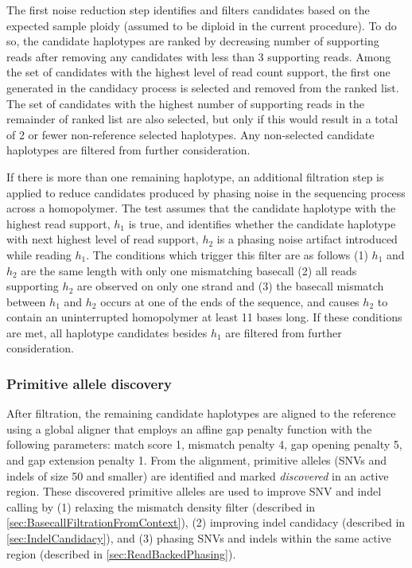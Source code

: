 \documentclass{article}
\begin{document}
The first noise reduction step identifies and filters candidates based on the expected sample ploidy (assumed to be diploid in the current procedure). To do so, the candidate haplotypes are ranked by decreasing number of supporting reads after removing any candidates with less than 3 supporting reads. Among the set of candidates with the highest level of read count support, the first one generated in the candidacy process is selected and removed from the ranked list. The set of candidates with the highest number of supporting reads in the remainder of ranked list are also selected, but only if this would result in a total of 2 or fewer non-reference selected haplotypes. Any non-selected candidate haplotypes are filtered from further consideration.

If there is more than one remaining haplotype, an additional filtration step is applied to reduce candidates produced by phasing noise in the sequencing process across a homopolymer. The test assumes that the candidate haplotype with the highest read support, $h_1$ is true, and identifies whether the candidate haplotype with next highest level of read support, $h_2$ is a phasing noise artifact introduced while reading $h_1$. The conditions which trigger this filter are as follows (1) $h_1$ and $h_2$ are the same length with only one mismatching basecall (2) all reads supporting $h_2$ are observed on only one strand and (3) the basecall mismatch between $h_1$ and $h_2$ occurs at one of the ends of the sequence, and causes $h_2$ to contain an uninterrupted homopolymer at least 11 bases long. If these conditions are met, all haplotype candidates besides $h_1$ are filtered from further consideration.

\subsubsection{Primitive allele discovery}
After filtration, the remaining candidate haplotypes are aligned to the reference using a global aligner that employs an affine gap penalty function with the following parameters: match score 1, mismatch penalty 4, gap opening penalty 5, and gap extension penalty 1. From the alignment, primitive alleles (SNVs and indels of size 50 and smaller) are identified and marked {\em discovered} in an active region. These discovered primitive alleles are used to improve SNV and indel calling by (1) relaxing the mismatch density filter (described in \ref{sec:BasecallFiltrationFromContext}), (2) improving indel candidacy (described in \ref{sec:IndelCandidacy}), and (3) phasing SNVs and indels within the same active region (described in \ref{sec:ReadBackedPhasing}).
\end{document}
